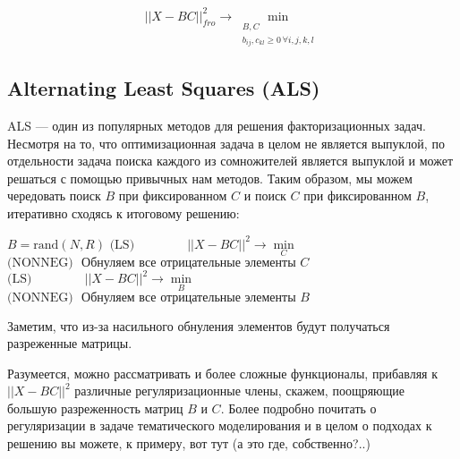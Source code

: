 \documentclass{amsart}
\theoremstyle{definition}
\theoremstyle{remark}
\numberwithin{equation}{section}
\begin{document}
$$||X - BC||^2_{fro}\longrightarrow\min\limits_{\begin{smallmatrix}B, C\\b_{ij}, c_{kl}\geqslant0\,\forall i,j,k,l\end{smallmatrix}}$$

\subsection{Alternating Least Squares (ALS)} ALS --- один из популярных методов для решения факторизационных задач. Несмотря на то, что оптимизационная задача в целом не является выпуклой, по отдельности задача поиска каждого из сомножителей является выпуклой и может решаться с помощью привычных нам методов. Таким образом, мы можем чередовать поиск $B$ при фиксированном $C$ и поиск $C$ при фиксированном $B$, итеративно сходясь к итоговому решению:

\begin{algorithmic}
\STATE $B = \mathrm{rand}(N, R)$
        \STATE $\mbox{(LS)}\qquad\qquad\ ||X - BC||^2\longrightarrow\min\limits_C$
        \STATE $\mbox{(NONNEG)}\ \ \ \mbox{Обнуляем все отрицательные элементы $C$}$
        \STATE $\mbox{(LS)}\qquad\qquad\ ||X - BC||^2\longrightarrow\min\limits_B$
        \STATE $\mbox{(NONNEG)}\ \ \ \mbox{Обнуляем все отрицательные элементы $B$}$
\ENDFOR
\end{algorithmic}

Заметим, что из-за насильного обнуления элементов будут получаться разреженные матрицы.

Разумеется, можно рассматривать и более сложные функционалы, прибавляя к $||X - BC||^2$ различные регуляризационные члены, скажем, поощряющие большую разреженность матриц $B$ и $C$. Более подробно почитать о регуляризации в задаче тематического моделирования и в целом о подходах к решению вы можете, к примеру, вот тут (а это где, собственно?..)
\end{document}
